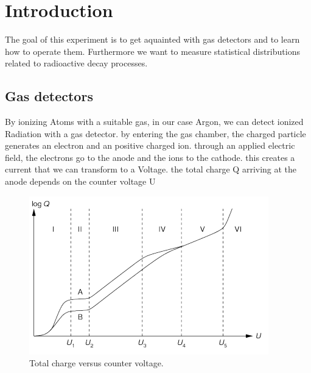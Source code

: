{}
\thispagestyle{plain}

\tableofcontents
\newpage
\listoffigures

\listoftables

\skippage

\setcounter{page}{1}
\restoregeometry
\thispagestyle{fancy}


\section{Introduction}

The goal of this experiment is to get aquainted with gas detectors and to learn how to operate them. Furthermore we want to measure statistical distributions related to radioactive decay processes.

\subsection{Gas detectors}


By ionizing Atoms with a suitable gas, in our case Argon, we can detect ionized Radiation with a gas detector.
by entering the gas chamber, the charged particle generates an electron and an positive charged ion.
through an applied electric field, the electrons go to the anode and the ions to the cathode. this creates a current
that we can transform to a Voltage.
the total charge Q arriving at the anode depends on the counter voltage U 

\begin{figure}[H]
\centering
\includegraphics[width=\textwidth]{../Figures/total.PNG}
\caption{Total charge versus counter voltage.}
\label{fig:Total}
\end{figure}

